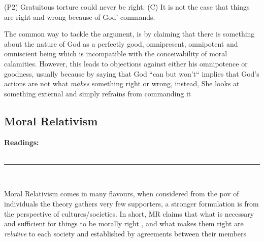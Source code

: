 \documentclass[english,course]{Notes}
\newcommand{\ita}[1]{\textit{#1}}
\newcommand\readings{\textbf{Readings:} \\}
\newcommand\sep{\\ \noindent\rule{10cm}{0.8pt} \\}
\begin{document}
{{
{(P2) Gratuitous torture could never be right.}
{(C) It is not the case that things are right and wrong because of God' 
commands.}

\par{The common way to tackle the argument, is by claiming that there is something about the nature of God as a perfectly good, omnipresent, omnipotent and omniscient being which is incompatible with the conceivability of moral calamities. However, this leads to objections against either his omnipotence or goodness, usually because by saying that God ``can but won't`` implies that God's actions are not what \ita{makes} something right or wrong, instead, She looks at something external and simply refrains from commanding it}




\newpage
\subsection{Moral Relativism}
\readings \cite[Chapter 1]{driver_2014} 
\sep

\par{Moral Relativism comes in many flavours, when considered from the pov of individuals the theory gathers very few supporters, a stronger formulation is from the perspective of cultures/societies. In short, MR claims that what is necessary and sufficient for things to be morally right , and what makes them right are \ita{relative} to each society and established by agreements between their members}

}}
\end{document}
